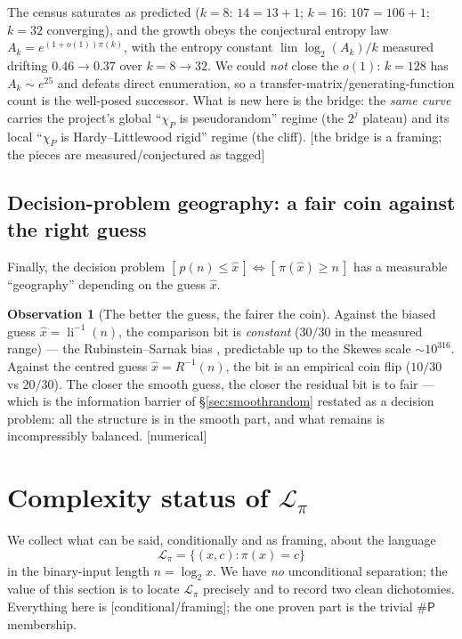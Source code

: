 \documentclass[11pt]{article}
\theoremstyle{plain}
\theoremstyle{definition}
\newtheorem{observation}[theorem]{Observation}
\theoremstyle{remark}
\newcommand{\stat}[1]{\quad\textnormal{\footnotesize\textsf{[\textcolor{accent}{#1}]}}}
\newcommand{\statline}[1]{\textnormal{\footnotesize\textsf{[\textcolor{accent}{#1}]}}}
\DeclareMathOperator{\li}{li}
\newcommand{\Rinv}{R^{-1}}
\newcommand{\chiP}{\chi_{P}}
\newcommand{\Lpi}{\mathcal{L}_{\pi}}
\begin{document}
The census saturates as predicted ($k=8$: $14=13{+}1$; $k=16$: $107=106{+}1$;
$k=32$ converging), and the growth obeys the conjectural entropy law
$A_k=e^{(1+o(1))\pi(k)}$, with the entropy constant $\lim \log_2(A_k)/k$ measured
drifting $0.46\to0.37$ over $k=8\to32$. We could \emph{not} close the $o(1)$:
$k=128$ has $A_k\sim e^{25}$ and defeats direct enumeration, so a
transfer-matrix/generating-function count is the well-posed successor. What is
new here is the bridge: the \emph{same curve} carries the project's global
``$\chiP$ is pseudorandom'' regime (the $2^j$ plateau) and its local
``$\chiP$ is Hardy--Littlewood rigid'' regime (the cliff).
\stat{the bridge is a framing; the pieces are measured/conjectured as tagged}

\subsection{Decision-problem geography: a fair coin against the right guess}

Finally, the decision problem $[\,p(n)\le \widehat{x}\,]\Leftrightarrow
[\,\pi(\widehat{x})\ge n\,]$ has a measurable ``geography'' depending on the guess
$\widehat{x}$.

\begin{observation}[The better the guess, the fairer the coin]
\label{obs:geography}
Against the biased guess $\widehat{x}=\li^{-1}(n)$, the comparison bit is
\emph{constant} ($30/30$ in the measured range) --- the Rubinstein--Sarnak bias
\cite{rubinsteinsarnak1994}, predictable up to the Skewes scale ${\sim}10^{316}$.
Against the centred guess $\widehat{x}=\Rinv(n)$, the bit is an empirical coin
flip ($10/30$ vs $20/30$). The closer the smooth guess, the closer the residual
bit is to fair --- which is the information barrier of \S\ref{sec:smoothrandom}
restated as a decision problem: all the structure is in the smooth part, and what
remains is incompressibly balanced.
\stat{numerical}
\end{observation}

\section{Complexity status of \texorpdfstring{$\Lpi$}{L-pi}}
\label{sec:complexity}

We collect what can be said, conditionally and as framing, about the language
\[
  \Lpi=\{(x,c):\pi(x)=c\}
\]
in the binary-input length $n=\log_2 x$. We have \emph{no} unconditional
separation; the value of this section is to locate $\Lpi$ precisely and to record
two clean dichotomies. Everything here is \statline{conditional/framing}; the one
proven part is the trivial $\#\mathsf{P}$ membership.
\end{document}
